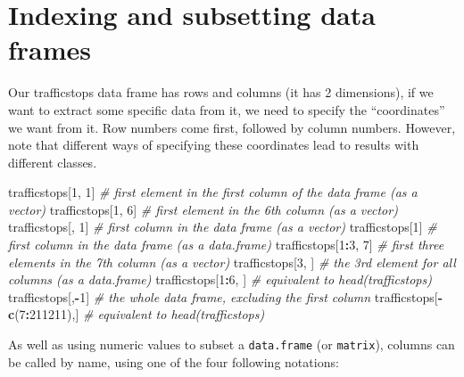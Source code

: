 \documentclass[]{book}
\newenvironment{Shaded}{\begin{snugshade}}{\end{snugshade}}
\newcommand{\KeywordTok}[1]{\textcolor[rgb]{0.13,0.29,0.53}{\textbf{#1}}}
\newcommand{\DecValTok}[1]{\textcolor[rgb]{0.00,0.00,0.81}{#1}}
\newcommand{\StringTok}[1]{\textcolor[rgb]{0.31,0.60,0.02}{#1}}
\newcommand{\CommentTok}[1]{\textcolor[rgb]{0.56,0.35,0.01}{\textit{#1}}}
\newcommand{\OperatorTok}[1]{\textcolor[rgb]{0.81,0.36,0.00}{\textbf{#1}}}
\newcommand{\NormalTok}[1]{#1}
\theoremstyle{definition}
\theoremstyle{definition}
\theoremstyle{remark}
\begin{document}
\section{Indexing and subsetting data
frames}\label{indexing-and-subsetting-data-frames}

Our trafficstops data frame has rows and columns (it has 2 dimensions),
if we want to extract some specific data from it, we need to specify the
``coordinates'' we want from it. Row numbers come first, followed by
column numbers. However, note that different ways of specifying these
coordinates lead to results with different classes.

\begin{Shaded}
\begin{Highlighting}[]
\NormalTok{trafficstops[}\DecValTok{1}\NormalTok{, }\DecValTok{1}\NormalTok{]   }\CommentTok{# first element in the first column of the data frame (as a vector)}
\NormalTok{trafficstops[}\DecValTok{1}\NormalTok{, }\DecValTok{6}\NormalTok{]   }\CommentTok{# first element in the 6th column (as a vector)}
\NormalTok{trafficstops[, }\DecValTok{1}\NormalTok{]    }\CommentTok{# first column in the data frame (as a vector)}
\NormalTok{trafficstops[}\DecValTok{1}\NormalTok{]      }\CommentTok{# first column in the data frame (as a data.frame)}
\NormalTok{trafficstops[}\DecValTok{1}\OperatorTok{:}\DecValTok{3}\NormalTok{, }\DecValTok{7}\NormalTok{] }\CommentTok{# first three elements in the 7th column (as a vector)}
\NormalTok{trafficstops[}\DecValTok{3}\NormalTok{, ]    }\CommentTok{# the 3rd element for all columns (as a data.frame)}
\NormalTok{trafficstops[}\DecValTok{1}\OperatorTok{:}\DecValTok{6}\NormalTok{, ]  }\CommentTok{# equivalent to head(trafficstops)}
\NormalTok{trafficstops[,}\OperatorTok{-}\DecValTok{1}\NormalTok{]           }\CommentTok{# the whole data frame, excluding the first column}
\NormalTok{trafficstops[}\OperatorTok{-}\KeywordTok{c}\NormalTok{(}\DecValTok{7}\OperatorTok{:}\DecValTok{211211}\NormalTok{),] }\CommentTok{# equivalent to head(trafficstops)}
\end{Highlighting}
\end{Shaded}

As well as using numeric values to subset a \texttt{data.frame} (or
\texttt{matrix}), columns can be called by name, using one of the four
following notations:

\begin{Shaded}
\end{Shaded}
\end{document}
